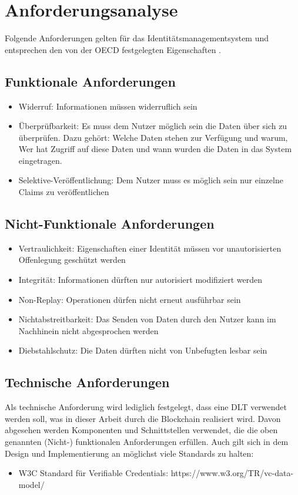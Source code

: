 \chapter{Anforderungsanalyse}
\label{cha:anforderungsanalyse}
Folgende Anforderungen gelten für das Identitätsmanagementsystem und entsprechen den von der OECD festgelegten Eigenschaften \cite{ID25} \cite{ID26}.
\section{Funktionale Anforderungen}

\begin{itemize}
	\item Widerruf: Informationen müssen widerruflich sein
	\item Überprüfbarkeit: Es muss dem Nutzer möglich sein die Daten über sich zu überprüfen. Dazu gehört: Welche Daten stehen zur Verfügung und warum, Wer hat Zugriff auf diese Daten und wann wurden die Daten in das System eingetragen.
	\item Selektive-Veröffentlichung: Dem Nutzer muss es möglich sein nur einzelne Claims zu veröffentlichen
\end{itemize}

\section{Nicht-Funktionale Anforderungen}

\begin{itemize}
	\item Vertraulichkeit: Eigenschaften einer Identität müssen vor unautorisierten Offenlegung geschützt werden
	\item Integrität: Informationen dürften nur autorisiert modifiziert werden
	\item Non-Replay: Operationen dürfen nicht erneut ausführbar sein
	\item Nichtabstreitbarkeit: Das Senden von Daten durch den Nutzer kann im Nachhinein nicht abgesprochen werden
	\item Diebstahlschutz: Die Daten dürften nicht von Unbefugten lesbar sein
	
\end{itemize}

\section{Technische Anforderungen}
Als technische Anforderung wird lediglich festgelegt, dass eine DLT verwendet werden soll, was in dieser Arbeit durch die Blockchain realisiert wird. Davon abgesehen werden Komponenten und Schnittstellen verwendet, die die oben genannten (Nicht-) funktionalen Anforderungen erfüllen.
Auch gilt sich in dem Design und Implementierung an möglichst viele Standards zu halten:
\begin{itemize}
	\item W3C Standard für Verifiable Credentials: https://www.w3.org/TR/vc-data-model/
\end{itemize}